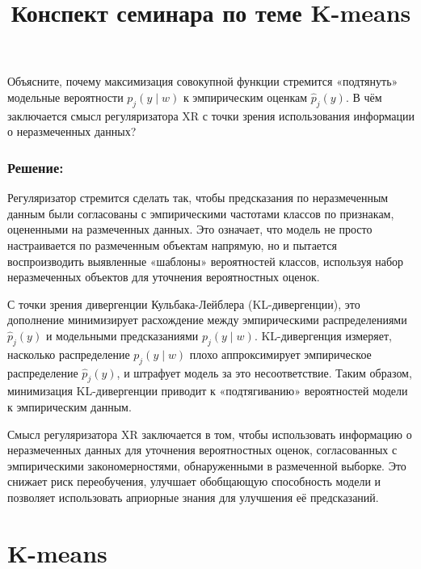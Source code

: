 Объясните, почему максимизация совокупной функции стремится «подтянуть» модельные вероятности $p_j(y \mid w)$ к эмпирическим оценкам $\hat{p}_j(y)$. В чём заключается смысл регуляризатора XR с точки зрения использования информации о неразмеченных данных?

\subsubsection*{Решение:} 
Регуляризатор стремится сделать так, чтобы предсказания по неразмеченным данным были согласованы с эмпирическими частотами классов по признакам, оцененными на размеченных данных. Это означает, что модель не просто настраивается по размеченным объектам напрямую, но и пытается воспроизводить выявленные «шаблоны» вероятностей классов, используя набор неразмеченных объектов для уточнения вероятностных оценок. 

С точки зрения дивергенции Кульбака-Лейблера (KL-дивергенции), это дополнение минимизирует расхождение между эмпирическими распределениями $\hat{p}_j(y)$ и модельными предсказаниями $p_j(y \mid w)$. KL-дивергенция измеряет, насколько распределение $p_j(y \mid w)$ плохо аппроксимирует эмпирическое распределение $\hat{p}_j(y)$, и штрафует модель за это несоответствие. Таким образом, минимизация KL-дивергенции приводит к «подтягиванию» вероятностей модели к эмпирическим данным.

Смысл регуляризатора XR заключается в том, чтобы использовать информацию о неразмеченных данных для уточнения вероятностных оценок, согласованных с эмпирическими закономерностями, обнаруженными в размеченной выборке. Это снижает риск переобучения, улучшает обобщающую способность модели и позволяет использовать априорные знания для улучшения её предсказаний.

\section*{K-means}
\title{Конспект семинара по теме K-means}


